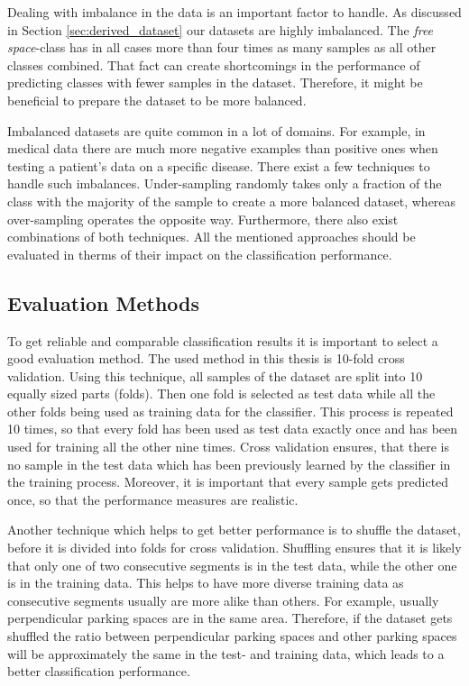 Dealing with imbalance in the data is an important factor to handle. As discussed in Section \ref{sec:derived_dataset} our datasets are highly imbalanced. The \emph{free space}-class has in all cases more than four times as many samples as all other classes combined. That fact can create shortcomings in the performance of predicting classes with fewer samples in the dataset. Therefore, it might be beneficial to prepare the dataset to be more balanced.

Imbalanced datasets are quite common in a lot of domains. For example, in medical data there are much more negative examples than positive ones when testing a patient's data on a specific disease. There exist a few techniques to handle such imbalances. Under-sampling randomly takes only a fraction of the class with the majority of the sample to create a more balanced dataset, whereas over-sampling operates the opposite way. Furthermore, there also exist combinations of both techniques. All the mentioned approaches should be evaluated in therms of their impact on the classification performance.




\subsection{Evaluation Methods}
\label{sec:evaluation_methods}

To get reliable and comparable classification results it is important to select a good evaluation method. The used method in this thesis is 10-fold cross validation. Using this technique, all samples of the dataset are split into 10 equally sized parts (folds). Then one fold is selected as test data while all the other folds being used as training data for the classifier. This process is repeated 10 times, so that every fold has been used as test data exactly once and has been used for training all the other nine times. Cross validation ensures, that there is no sample in the test data which has been previously learned by the classifier in the training process. Moreover, it is important that every sample gets predicted once, so that the performance measures are realistic.

Another technique which helps to get better performance is to shuffle the dataset, before it is divided into folds for cross validation. Shuffling ensures that it is likely that only one of two consecutive segments is in the test data, while the other one is in the training data. This helps to have more diverse training data as consecutive segments usually are more alike than others. For example, usually perpendicular parking spaces are in the same area. Therefore, if the dataset gets shuffled the ratio between perpendicular parking spaces and other parking spaces will be approximately the same in the test- and training data, which leads to a better classification performance.




